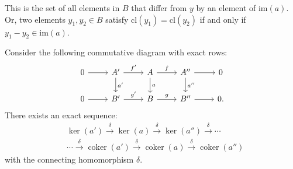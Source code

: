 This is the set of all elements in \( B \) that differ from \( y \) by an element of \( \text{im}(a) \). Or, two elements \( y_1, y_2 \in B \) satisfy \( \text{cl}(y_1) = \text{cl}(y_2) \) if and only if \( y_1 - y_2 \in \text{im}(a) \).

\begin{lemma}{\cite[\S 1.2.6]{Weibel1994}}
	\label{snake}
	Consider the following commutative diagram with exact rows:
	\begin{equation}
		\begin{tikzcd}
			0 \arrow[r] & A' \arrow[r, "f'"] \arrow[d, "a'"] & A \arrow[r, "f"] \arrow[d, "a"] & A'' \arrow[r] \arrow[d, "a''"] & 0 \\
			0 \arrow[r] & B' \arrow[r, "g'"] & B \arrow[r, "g"] & B'' \arrow[r] & 0.
		\end{tikzcd}
	\end{equation}
	There exists an exact sequence:
	\begin{align}
		  & \ker(a') \xrightarrow{\delta} \ker(a) \xrightarrow{\delta} \ker(a'') \xrightarrow{\delta} \cdots                                                 \\
		  & \cdots \xrightarrow{\delta} \operatorname{coker}(a') \xrightarrow{\delta} \operatorname{coker}(a) \xrightarrow{\delta} \operatorname{coker}(a'') 
	\end{align}
	with the connecting homomorphism \(\delta\).
\end{lemma}

